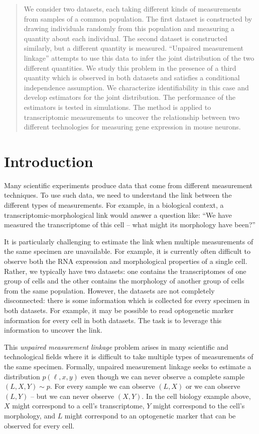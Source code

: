 \documentclass{article}
\theoremstyle{definition}
\begin{document}
\begin{abstract}
We consider two datasets, each taking different kinds of measurements from samples of a common population.  The first dataset is constructed by drawing individuals randomly from this population and measuring a quantity about each individual.   The second dataset is constructed similarly, but a different quantity is measured.  ``Unpaired measurement linkage'' attempts to use this data to infer the joint distribution of the two different quantities.  We study this problem in the presence of a third quantity which is observed in both datasets and satisfies a conditional independence assumption.  We characterize identifiability in this case and develop estimators for the joint distribution.  The performance of the estimators is tested in simulations.  The method is applied to transcriptomic measurements to uncover the relationship between two different technologies for measuring gene expression in mouse neurons.
\end{abstract}

\section{Introduction}

Many scientific experiments produce data that come from different measurement techniques.  To use such data, we need to understand the link between the different types of measurements.  For example, in a biological context, a transcriptomic-morphological link would answer a question like:  ``We have measured the transcriptome of this cell -- what might its morphology have been?''

It is particularly challenging to estimate the link when multiple measurements of the same specimen are unavailable.  For example, it is currently often difficult to observe both the RNA expression and morphological properties of a single cell.  Rather, we typically have two datasets: one contains the transcriptomes of one group of cells and the other contains the morphology of another group of cells from the same population.   However, the datasets are not completely disconnected: there is some information which is collected for every specimen in both datasets.  For example, it may be possible to read optogenetic marker information for every cell in both datasets.  The task is to leverage this information to uncover the link.  

This \emph{unpaired measurement linkage} problem arises in many scientific and technological fields where it is difficult to take multiple types of measurements of the same specimen.  Formally, unpaired measurement linkage seeks to estimate a distribution $p(\ell,x,y)$ even though we can never observe a complete sample $(L,X,Y)\sim p$.  For every sample we can observe $(L,X)$ or we can observe $(L,Y)$ -- but we can never observe $(X,Y)$.  In the cell biology example above, $X$ might correspond to a cell's transcriptome, $Y$ might correspond to the cell's morphology, and $L$ might correspond to an optogenetic marker that can be observed for every cell.  
\end{document}
